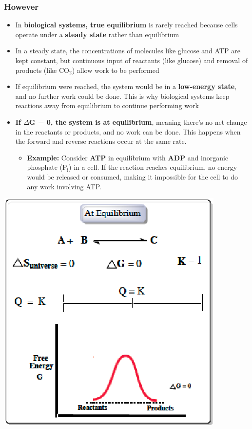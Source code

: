 \documentclass[10pt]{article}
\begin{document}
\subsubsection*{However}
\begin{itemize}
    \item In \textbf{biological systems, true equilibrium} is rarely reached because cells operate under a \textbf{steady state} rather than equilibrium
    \item In a steady state, the concentrations of molecules like glucose and ATP are kept constant, but continuous input of reactants (like glucose) and removal of products (like CO$_2$) allow work to be performed
    \item If equilibrium were reached, the system would be in a \textbf{low-energy state}, and no further work could be done. This is why biological systems keep reactions away from equilibrium to continue performing work
\end{itemize}
\begin{itemize}
    \item \textbf{If $\Delta$G = 0, the system is at equilibrium}, meaning there's no net change in the reactants or products, and no work can be done.  This happens when the forward and reverse reactions occur at the same rate.
    \begin{itemize}
        \item \textbf{Example:} Consider \textbf{ATP} in equilibrium with \textbf{ADP} and inorganic phosphate (P$_\text{i}$) in a cell.  If the reaction reaches equilibrium, no energy would be released or consumed, making it impossible for the cell to do any work involving ATP.
    \end{itemize}
\end{itemize}
\begin{center}
    \includegraphics[scale=0.9]{L3_11.png}
\end{center}
\end{document}
